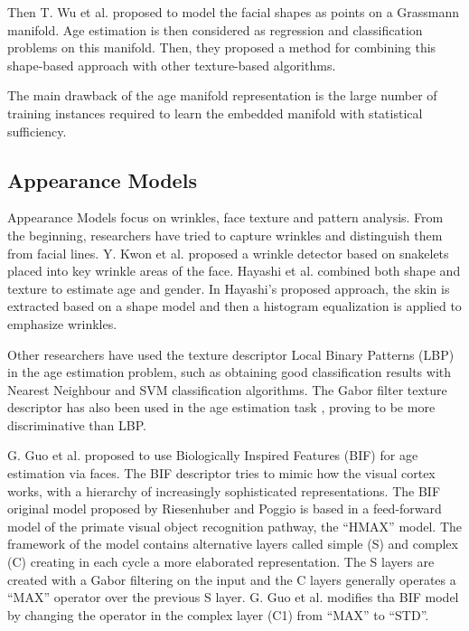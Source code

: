 Then T. Wu et al. \cite{journals/tifs/WuTC12} proposed to model the facial shapes as points on a Grassmann manifold. Age estimation is then considered as regression and classification problems on this manifold. Then, they proposed a method for combining this shape-based approach with other texture-based algorithms.

The main drawback of the age manifold representation is the large number of training instances required to learn the embedded manifold with statistical sufficiency.

\subsection{Appearance Models}\label{subsec:BIF}

Appearance Models focus on wrinkles, face texture and pattern analysis. From the beginning, researchers have tried to capture wrinkles and distinguish them from facial lines. Y. Kwon et al. \cite{Kwon:1999:ACF:311844.311845} proposed a wrinkle detector based on snakelets \cite{Kass88snakes:active} placed into key wrinkle areas of the face. Hayashi et al. \cite{969698} \cite{1195171} \cite{conf/icpr/HayashiYIK02} combined both shape and texture to estimate age and gender. In Hayashi's proposed approach, the skin is extracted based on a shape model and then a histogram equalization is applied to emphasize wrinkles.

Other researchers have used the texture descriptor Local Binary Patterns (LBP) \cite{Ahonen:2006:FDL:1175897.1176245} in the age estimation problem, such as \cite{4717926} \cite{6460367} obtaining good classification results with Nearest Neighbour and SVM classification algorithms. The Gabor \cite{Liu:2002:GFB:2319007.2320264} filter texture descriptor has also been used in the age estimation task  \cite{Gao:2009:FAC:1567988.1568003}, proving to be more discriminative than LBP.

G. Guo et al. \cite{conf/cvpr/GuoMFH09} proposed to use Biologically Inspired Features (BIF) \cite{Riesenhuber99hierarchicalmodels} for age estimation via faces. The BIF descriptor tries to mimic how the visual cortex works, with a hierarchy of increasingly sophisticated representations. The BIF original model proposed by Riesenhuber and Poggio \cite{Riesenhuber99hierarchicalmodels} is based in a feed-forward model of the primate visual object recognition pathway, the ``HMAX'' model. The framework of the model contains alternative layers called simple (S) and complex (C) creating in each cycle a more elaborated representation. The S layers are created with a Gabor filtering on the input and the C layers generally operates a ``MAX'' operator over the previous S layer. G. Guo et al. \cite{conf/cvpr/GuoMFH09} modifies tha BIF model by changing the operator in the complex layer (C1) from ``MAX'' to ``STD''.

